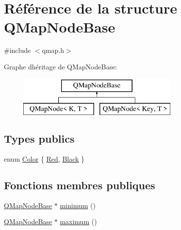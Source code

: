 \hypertarget{struct_q_map_node_base}{}\section{Référence de la structure Q\+Map\+Node\+Base}
\label{struct_q_map_node_base}


{\ttfamily \#include $<$qmap.\+h$>$}

Graphe d\textquotesingle{}héritage de Q\+Map\+Node\+Base\+:\begin{figure}[H]
\begin{center}
\leavevmode
\includegraphics[height=2.000000cm]{struct_q_map_node_base}
\end{center}
\end{figure}
\subsection*{Types publics}
\begin{DoxyCompactItemize}
\item 
enum \hyperlink{struct_q_map_node_base_a8d262e109c5db0292c19141d585c96a9}{Color} \{ \hyperlink{struct_q_map_node_base_a8d262e109c5db0292c19141d585c96a9a9bffc80754cb87fa880417571e785e1b}{Red}, 
\hyperlink{struct_q_map_node_base_a8d262e109c5db0292c19141d585c96a9a4a3c720b5a1ffee5b349ac2da8c5a2e1}{Black}
 \}
\end{DoxyCompactItemize}
\subsection*{Fonctions membres publiques}
\begin{DoxyCompactItemize}
\item 
\hyperlink{struct_q_map_node_base}{Q\+Map\+Node\+Base} $\ast$ \hyperlink{struct_q_map_node_base_aded563f065b53b597ae7b814ac2a5d4e}{minimum} ()
\item 
\hyperlink{struct_q_map_node_base}{Q\+Map\+Node\+Base} $\ast$ \hyperlink{struct_q_map_node_base_a7cb41ec9d15ad468eb6a7df234e0cb8e}{maximum} ()
\end{DoxyCompactItemize}
